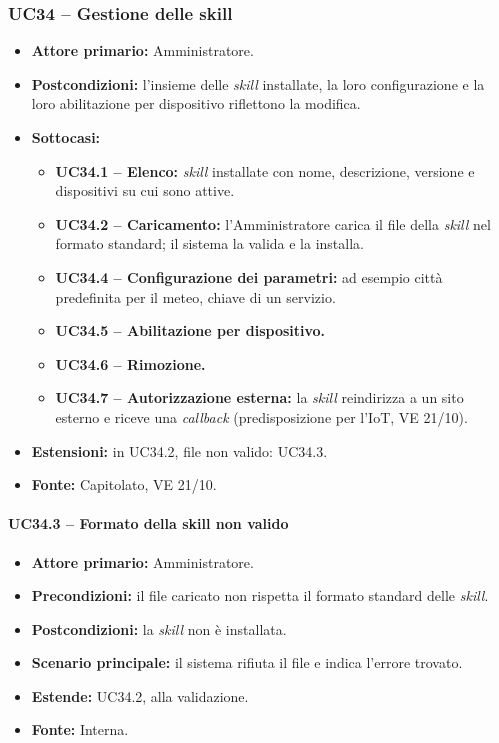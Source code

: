 \documentclass[12pt,a4paper]{article}
\newcommand{\tightlist}{\setlength{\itemsep}{1pt}\setlength{\parskip}{0pt}}
\begin{document}
\subsubsection{UC34 -- Gestione delle skill}
\begin{itemize}
\tightlist
\item \textbf{Attore primario:} Amministratore.
\item \textbf{Postcondizioni:} l'insieme delle \emph{skill} installate, la loro configurazione e la loro abilitazione per dispositivo riflettono la modifica.
\item \textbf{Sottocasi:}
\begin{itemize}
\tightlist
\item \textbf{UC34.1 -- Elenco:} \emph{skill} installate con nome, descrizione, versione e dispositivi su cui sono attive.
\item \textbf{UC34.2 -- Caricamento:} l'Amministratore carica il file della \emph{skill} nel formato standard; il sistema la valida e la installa.
\item \textbf{UC34.4 -- Configurazione dei parametri:} ad esempio città predefinita per il meteo, chiave di un servizio.
\item \textbf{UC34.5 -- Abilitazione per dispositivo.}
\item \textbf{UC34.6 -- Rimozione.}
\item \textbf{UC34.7 -- Autorizzazione esterna:} la \emph{skill} reindirizza a un sito esterno e riceve una \emph{callback} (predisposizione per l'IoT, VE 21/10).
\end{itemize}
\item \textbf{Estensioni:} in UC34.2, file non valido: UC34.3.
\item \textbf{Fonte:} Capitolato, VE 21/10.
\end{itemize}

\paragraph{UC34.3 -- Formato della skill non valido}
\begin{itemize}
\tightlist
\item \textbf{Attore primario:} Amministratore.
\item \textbf{Precondizioni:} il file caricato non rispetta il formato standard delle \emph{skill}.
\item \textbf{Postcondizioni:} la \emph{skill} non è installata.
\item \textbf{Scenario principale:} il sistema rifiuta il file e indica l'errore trovato.
\item \textbf{Estende:} UC34.2, alla validazione.
\item \textbf{Fonte:} Interna.
\end{itemize}
\end{document}
